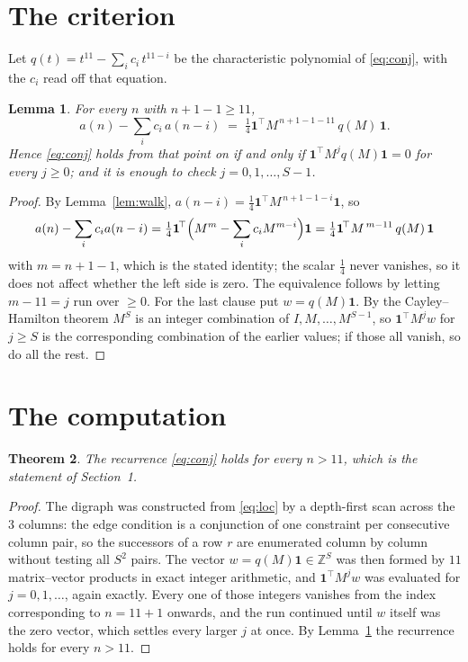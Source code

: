 \documentclass[11pt,a4paper]{article}
\theoremstyle{plain}
\newtheorem{theorem}{Theorem}
\newtheorem{lemma}[theorem]{Lemma}
\theoremstyle{definition}
\begin{document}
\section{The criterion}

Let $q(t)=t^{11}-\sum_i c_i\,t^{11-i}$ be the characteristic polynomial of
\eqref{eq:conj}, with the $c_i$ read off that equation.

\begin{lemma}\label{lem:crit}
For every $n$ with $n+1-1\ge11$,
\[
a(n)-\sum_i c_i\,a(n-i)\;=\;\tfrac1{4}\mathbf{1}^{\!\top}M^{\,n+1-1-11}\,q(M)\,\mathbf{1} .
\]
Hence \eqref{eq:conj} holds from that point on if and only if
$\mathbf{1}^{\!\top}M^{j}q(M)\mathbf{1}=0$ for every $j\ge0$; and it is enough to check
$j=0,1,\dots,S-1$.
\end{lemma}

\begin{proof}
By Lemma~\ref{lem:walk}, $a(n-i)=\tfrac1{4}\mathbf{1}^{\!\top}M^{\,n+1-1-i}\mathbf{1}$, so
\[
a(n)-\sum_i c_i a(n-i)
=\tfrac1{4}\mathbf{1}^{\!\top}\Bigl(M^{m}-\sum_i c_i M^{m-i}\Bigr)\mathbf{1}
=\tfrac1{4}\mathbf{1}^{\!\top}M^{\,m-11}\,q(M)\,\mathbf{1}
\]
with $m=n+1-1$, which is the stated identity; the scalar $\tfrac1{4}$ never vanishes, so
it does not affect whether the left side is zero. The equivalence follows by letting
$m-11=j$ run over $\ge0$. For the last clause put $w=q(M)\mathbf{1}$. By the
Cayley--Hamilton theorem $M^{S}$ is an integer combination of $I,M,\dots,M^{S-1}$, so
$\mathbf{1}^{\!\top}M^{j}w$ for $j\ge S$ is the corresponding combination of the earlier
values; if those all vanish, so do all the rest.
\end{proof}

\section{The computation}

\begin{theorem}
The recurrence \eqref{eq:conj} holds for every $n>11$, which is the statement of
Section~1.
\end{theorem}

\begin{proof}
The digraph was constructed from \eqref{eq:loc} by a depth-first scan across the $3$
columns: the edge condition is a conjunction of one constraint per consecutive column
pair, so the successors of a row $r$ are enumerated column by column without testing all
$S^2$ pairs. The vector $w=q(M)\mathbf{1}\in\mathbb{Z}^{S}$ was then formed by $11$
matrix--vector products in exact integer arithmetic, and $\mathbf{1}^{\!\top}M^{j}w$ was
evaluated for $j=0,1,\dots$, again exactly. Every one of those integers vanishes from the
index corresponding to $n=11+1$ onwards, and the run continued until $w$ itself was the
zero vector, which settles every larger $j$ at once. By Lemma~\ref{lem:crit} the recurrence
holds for every $n>11$.
\end{proof}
\end{document}
